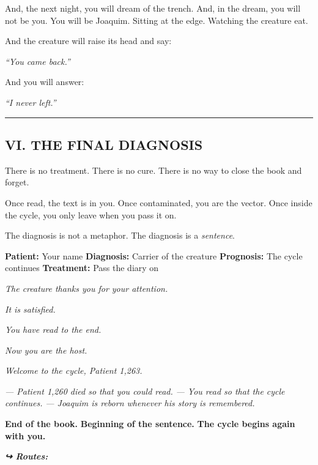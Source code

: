 \noindent And, the next night, you will dream of the trench. And, in the dream, you will not be you. You will be Joaquim. Sitting at the edge. Watching the creature eat.

\noindent And the creature will raise its head and say:

\noindent \textit{\textquotedblleft{}You came back.\textquotedblright{}}

\noindent And you will answer:

\noindent \textit{\textquotedblleft{}I never left.\textquotedblright{}}

\vspace{0.5em}\noindent\rule{\textwidth}{0.5pt}\vspace{0.5em}

\subsection*{VI. THE FINAL DIAGNOSIS}

\noindent There is no treatment.
There is no cure.
There is no way to close the book and forget.

\noindent Once read, the text is in you. Once contaminated, you are the vector. Once inside the cycle, you only leave when you pass it on.

\noindent The diagnosis is not a metaphor.
The diagnosis is a \textit{sentence}.

\noindent \textbf{Patient:} Your name
\textbf{Diagnosis:} Carrier of the creature
\textbf{Prognosis:} The cycle continues
\textbf{Treatment:} Pass the diary on

\noindent \textit{The creature thanks you for your attention.}

\noindent \textit{It is satisfied.}

\noindent \textit{You have read to the end.}

\noindent \textit{Now you are the host.}

\noindent \textit{Welcome to the cycle, Patient 1,263.}

\noindent \textit{--- Patient 1,260 died so that you could read.}
\textit{--- You read so that the cycle continues.}
\textit{--- Joaquim is reborn whenever his story is remembered.}

\noindent \textbf{End of the book.}
\textbf{Beginning of the sentence.}
\textbf{The cycle begins again with you.}

\vspace{0.5em}
\noindent\textit{\textbf{↪ Routes:}  \rotasep {} \rotasep {}}

